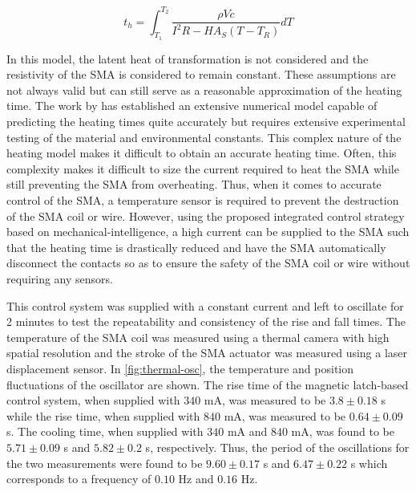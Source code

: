 \begin{equation}\label{eq:heatingtime}
  t_h = \int_{T_1}^{T_2} \frac{\rho Vc}{I^2R-HA_S(T-T_R)} dT
\end{equation}

In this model, the latent heat of transformation is not considered and the resistivity of the SMA is considered to remain constant. These assumptions are not always valid but can still serve as a reasonable approximation of the heating time. The work by \cite{liuActuationFrequencyModeling2021} has established an extensive numerical model capable of predicting the heating times quite accurately but requires extensive experimental testing of the material and environmental constants. This complex nature of the heating model makes it difficult to obtain an accurate heating time. Often, this complexity makes it difficult to size the current required to heat the SMA while still preventing the SMA from overheating. Thus, when it comes to accurate control of the SMA, a temperature sensor is required to prevent the destruction of the SMA coil or wire. However, using the proposed integrated control strategy based on mechanical-intelligence, a high current can be supplied to the SMA such that the heating time is drastically reduced and have the SMA automatically disconnect the contacts so as to ensure the safety of the SMA coil or wire without requiring any sensors.

This control system was supplied with a constant current and left to oscillate for 2 minutes to test the repeatability and consistency of the rise and fall times. The temperature of the SMA coil was measured using a thermal camera with high spatial resolution and the stroke of the SMA actuator was measured using a laser displacement sensor. In \cref{fig:thermal-osc}, the temperature and position fluctuations of the oscillator are shown. The rise time of the magnetic latch-based control system, when supplied with $340$ mA, was measured to be $3.8 \pm 0.18$ s while the rise time, when supplied with $840$ mA, was measured to be $0.64 \pm 0.09$ s. The cooling time, when supplied with $340$ mA and $840$ mA, was found to be $5.71 \pm 0.09$ s and $5.82 \pm 0.2$ s, respectively. Thus, the period of the oscillations for the two measurements were found to be $9.60 \pm 0.17$ s and $6.47 \pm 0.22$ s which corresponds to a frequency of $0.10$ Hz and $0.16$ Hz.

